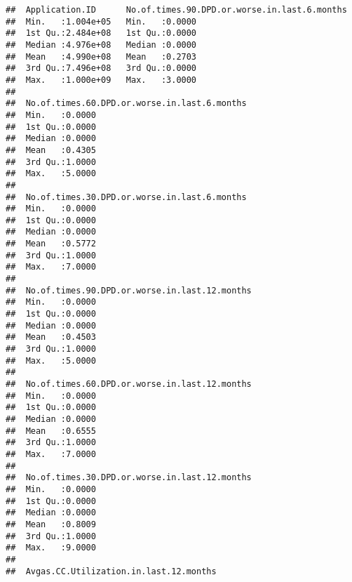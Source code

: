 \documentclass[]{article}
\begin{document}
\begin{verbatim}
##  Application.ID      No.of.times.90.DPD.or.worse.in.last.6.months
##  Min.   :1.004e+05   Min.   :0.0000                              
##  1st Qu.:2.484e+08   1st Qu.:0.0000                              
##  Median :4.976e+08   Median :0.0000                              
##  Mean   :4.990e+08   Mean   :0.2703                              
##  3rd Qu.:7.496e+08   3rd Qu.:0.0000                              
##  Max.   :1.000e+09   Max.   :3.0000                              
##                                                                  
##  No.of.times.60.DPD.or.worse.in.last.6.months
##  Min.   :0.0000                              
##  1st Qu.:0.0000                              
##  Median :0.0000                              
##  Mean   :0.4305                              
##  3rd Qu.:1.0000                              
##  Max.   :5.0000                              
##                                              
##  No.of.times.30.DPD.or.worse.in.last.6.months
##  Min.   :0.0000                              
##  1st Qu.:0.0000                              
##  Median :0.0000                              
##  Mean   :0.5772                              
##  3rd Qu.:1.0000                              
##  Max.   :7.0000                              
##                                              
##  No.of.times.90.DPD.or.worse.in.last.12.months
##  Min.   :0.0000                               
##  1st Qu.:0.0000                               
##  Median :0.0000                               
##  Mean   :0.4503                               
##  3rd Qu.:1.0000                               
##  Max.   :5.0000                               
##                                               
##  No.of.times.60.DPD.or.worse.in.last.12.months
##  Min.   :0.0000                               
##  1st Qu.:0.0000                               
##  Median :0.0000                               
##  Mean   :0.6555                               
##  3rd Qu.:1.0000                               
##  Max.   :7.0000                               
##                                               
##  No.of.times.30.DPD.or.worse.in.last.12.months
##  Min.   :0.0000                               
##  1st Qu.:0.0000                               
##  Median :0.0000                               
##  Mean   :0.8009                               
##  3rd Qu.:1.0000                               
##  Max.   :9.0000                               
##                                               
##  Avgas.CC.Utilization.in.last.12.months

\end{verbatim}
\end{document}
